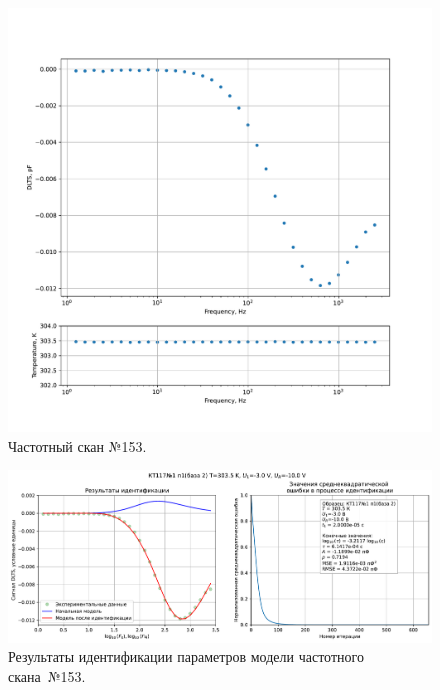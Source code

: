 \begin{figure}[!ht]
    \centering
    \includegraphics[width=1\textwidth]{../plots/КТ117№1_п1(база 2)_2500Гц-1Гц_1пФ_+30С_-3В-10В_200мВ_20мкс_шаг_0,1.pdf}
    \caption{Частотный скан №153.}
    \label{pic:frequency_scan_153}
\end{figure}

\begin{figure}[!ht]
    \centering
    \includegraphics[width=1\textwidth]{../plots/КТ117№1_п1(база 2)_2500Гц-1Гц_1пФ_+30С_-3В-10В_200мВ_20мкс_шаг_0,1_model.pdf}
    \caption{Результаты идентификации параметров модели частотного скана~№153.}
    \label{pic:frequency_scan_model153}
\end{figure}

\pagebreak


